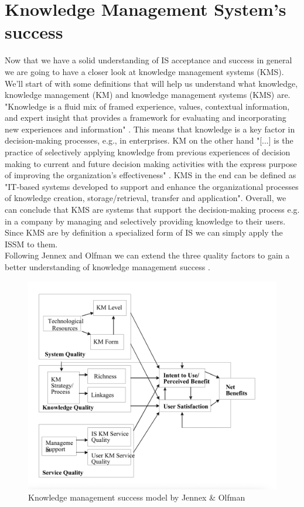 \documentclass[
	english,
	ruledheaders=section,%
	class=report,%
	thesis={type=bachelor},%
	accentcolor=1b,%
	custommargins=true,%
	marginpar=false,%
	parskip=half-,%
	fontsize=11pt,%
	DIV=14,
]{tudapub}
\begin{document}
\section{Knowledge Management System's success}
Now that we have a solid understanding of IS acceptance and success in general we are going to have a closer look at knowledge management systems (KMS). We'll start of with some definitions that will help us understand what knowledge, knowledge management (KM) and knowledge management systems (KMS) are. "Knowledge is a fluid mix of framed experience, values, contextual information, and expert insight that provides a framework for
evaluating and incorporating new experiences and information" \parencite[p.~15]{Davenport}. This means that knowledge is a key factor in decision-making processes, e.g., in enterprises. KM on the other hand "[...] is the practice of selectively applying knowledge from previous experiences of decision making to current and future decision making activities with the express purpose of improving the organization’s effectiveness" \parencite{Jennex2006WhatIsKM}. KMS in the end can be defined as "IT-based systems developed to support and enhance the organizational processes of knowledge creation, storage/retrieval, transfer and application". Overall, we can conclude that KMS are systems that support the decision-making process e.g. in a company by managing and selectively providing knowledge to their users. Since KMS are by definition a specialized form of IS we can simply apply the ISSM to them.\\
Following Jennex and Olfman we can extend the three quality factors to gain a better understanding
of knowledge management success \parencite{Jennex2006}.\\
\begin{figure}
    \centering
    \includegraphics[width=1\linewidth]{knowledge_management_success.png}
    \caption{Knowledge management success model by Jennex & Olfman}
    \label{fig:enter-label}
\end{figure}
\end{document}
